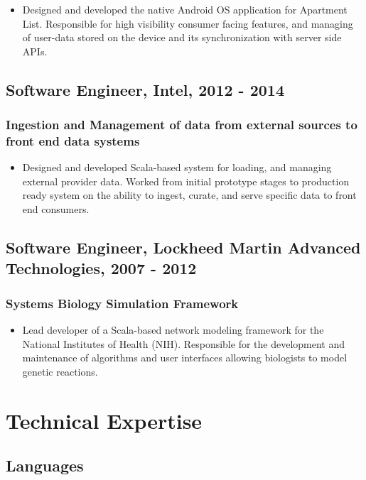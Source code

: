 \documentclass[11pt]{article}
\begin{document}
\begin{itemize}
\item Designed and developed the native Android OS application for Apartment List. Responsible for high visibility consumer facing features, and managing of user-data stored on the device and its synchronization with server side APIs.
\end{itemize}

\subsection*{Software Engineer, Intel, 2012 - 2014}
\label{sec-1-6}
\subsubsection*{Ingestion and Management of data from external sources to front end data systems}
\label{sec-1-6-1}

\begin{itemize}
\item Designed and developed Scala-based system for loading, and managing external provider data. Worked from initial prototype stages to production ready system on the ability to ingest, curate, and serve specific data to front end consumers.
\end{itemize}

\subsection*{Software Engineer, Lockheed Martin Advanced Technologies, 2007 - 2012}
\label{sec-1-7}
\subsubsection*{Systems Biology Simulation Framework}
\label{sec-1-7-1}

\begin{itemize}
\item Lead developer of a Scala-based network modeling framework for the National Institutes of Health (NIH). Responsible for the development and maintenance of algorithms and user interfaces allowing biologists to model genetic reactions.
\end{itemize}

\section*{Technical Expertise}
\label{sec-2}
\subsection*{Languages}
\label{sec-2-1}
\end{document}
